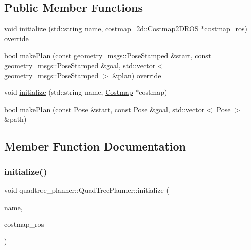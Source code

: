 \subsection*{Public Member Functions}
\begin{DoxyCompactItemize}
\item 
void \hyperlink{classquadtree__planner_1_1QuadTreePlanner_a95b6b962b0bb8b7cb3a823d853ad447f}{initialize} (std\+::string name, costmap\+\_\+2d\+::\+Costmap2\+D\+R\+OS $\ast$costmap\+\_\+ros) override
\item 
bool \hyperlink{classquadtree__planner_1_1QuadTreePlanner_a65ced31e9ea72cbee760f593f47115cd}{make\+Plan} (const geometry\+\_\+msgs\+::\+Pose\+Stamped \&start, const geometry\+\_\+msgs\+::\+Pose\+Stamped \&goal, std\+::vector$<$ geometry\+\_\+msgs\+::\+Pose\+Stamped $>$ \&plan) override
\item 
void \hyperlink{classquadtree__planner_1_1QuadTreePlanner_a6bc83db035560028672f572a985d05b7}{initialize} (std\+::string name, \hyperlink{classquadtree__planner_1_1Costmap}{Costmap} $\ast$costmap)
\item 
bool \hyperlink{classquadtree__planner_1_1QuadTreePlanner_a6f194e11417938fd90bcc74bcb578dca}{make\+Plan} (const \hyperlink{structquadtree__planner_1_1Pose}{Pose} \&start, const \hyperlink{structquadtree__planner_1_1Pose}{Pose} \&goal, std\+::vector$<$ \hyperlink{structquadtree__planner_1_1Pose}{Pose} $>$ \&path)
\end{DoxyCompactItemize}


\subsection{Member Function Documentation}
\mbox{\label{classquadtree__planner_1_1QuadTreePlanner_a95b6b962b0bb8b7cb3a823d853ad447f}} 
\subsubsection{\texorpdfstring{initialize()}{initialize()}\hspace{0.1cm}{\footnotesize\ttfamily [1/2]}}
{\footnotesize\ttfamily void quadtree\+\_\+planner\+::\+Quad\+Tree\+Planner\+::initialize (\begin{DoxyParamCaption}\item[{std\+::string}]{name,  }\item[{costmap\+\_\+2d\+::\+Costmap2\+D\+R\+OS $\ast$}]{costmap\+\_\+ros }\end{DoxyParamCaption})\hspace{0.3cm}{\ttfamily [override]}}

